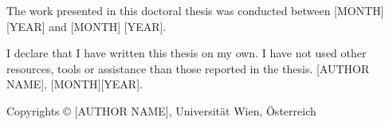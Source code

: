 \thispagestyle{empty}
\vfill
The work presented in this doctoral thesis was conducted between [MONTH] [YEAR] and [MONTH] [YEAR].





I declare that I have written this thesis on my own.
I have not used other resources, tools or assistance than those reported in the thesis.
[AUTHOR NAME], [MONTH][YEAR].

\begin{center}
	Copyrights © [AUTHOR NAME], Universität Wien, Österreich 
\end{center}






